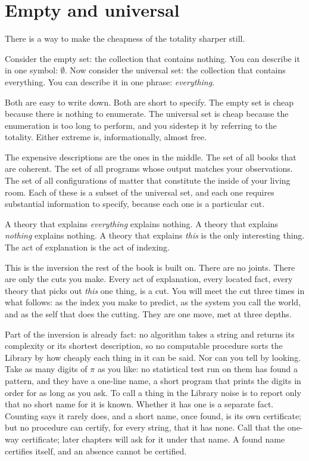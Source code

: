 \section*{Empty and universal}

There is a way to make the cheapness of the totality sharper still.

Consider the empty set: the collection that contains nothing. You can describe it in one symbol: $\emptyset$. Now consider the universal set: the collection that contains everything. You can describe it in one phrase: \emph{everything}.

Both are easy to write down. Both are short to specify. The empty set is cheap because there is nothing to enumerate. The universal set is cheap because the enumeration is too long to perform, and you sidestep it by referring to the totality. Either extreme is, informationally, almost free.

The expensive descriptions are the ones in the middle. The set of all books that are coherent. The set of all programs whose output matches your observations. The set of all configurations of matter that constitute the inside of your living room. Each of these is a subset of the universal set, and each one requires substantial information to specify, because each one is a particular cut.

A theory that explains \emph{everything} explains nothing. A theory that explains \emph{nothing} explains nothing. A theory that explains \emph{this} is the only interesting thing. The act of explanation is the act of indexing.

This is the inversion the rest of the book is built on. There are no joints. There are only the cuts you make. Every act of explanation, every located fact, every theory that picks out \emph{this} one thing, is a cut. You will meet the cut three times in what follows: as the index you make to predict, as the system you call the world, and as the self that does the cutting. They are one move, met at three depths.

Part of the inversion is already fact: no algorithm takes a string and returns its complexity or its shortest description, so no computable procedure sorts the Library by how cheaply each thing in it can be said. Nor can you tell by looking. Take as many digits of $\pi$ as you like: no statistical test run on them has found a pattern, and they have a one-line name, a short program that prints the digits in order for as long as you ask. To call a thing in the Library noise is to report only that no short name for it is known. Whether it has one is a separate fact. Counting says it rarely does, and a short name, once found, is its own certificate; but no procedure can certify, for every string, that it has none. Call that the one-way certificate; later chapters will ask for it under that name. A found name certifies itself, and an absence cannot be certified.

